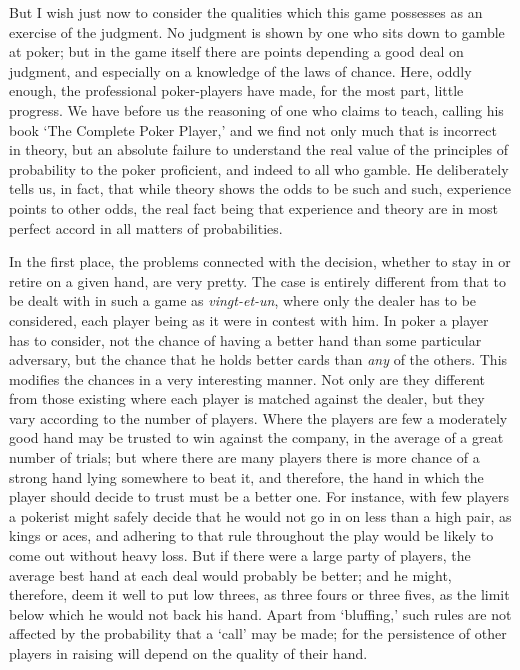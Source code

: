 \documentclass[letterpaper,12pt,oneside,openany]{memoir}
\begin{document}
But I wish just now to consider the qualities which
this game possesses as an exercise of the judgment. No
judgment is shown by one who sits down to gamble at
poker; but in the game itself there are points depending
a good deal on judgment, and especially on a knowledge
of the laws of chance. Here, oddly enough,
the professional poker-players have made, for the most
part, little progress. We have before us the reasoning
of one who claims to teach, calling his book `The Complete
Poker Player,' and we find not only much that is
incorrect in theory, but an absolute failure to understand
the real value of the principles of probability to
the poker proficient, and indeed to all who gamble. He
deliberately tells us, in fact, that while theory shows the
odds to be such and such, experience points to other
odds, the real fact being that experience and theory are
in most perfect accord in all matters of probabilities.

In the first place, the problems connected with the
decision, whether to stay in or retire on a given hand,
are very pretty. The case is entirely different from that
to be dealt with in such a game as \textit{vingt-et-un}, where
only the dealer has to be considered, each player being
as it were in contest with him. In poker a player has
to consider, not the chance of having a better hand than
some particular adversary, but the chance that he holds
better cards than \emph{any} of the others. This modifies the
chances in a very interesting manner. Not only are
they different from those existing where each player is
matched against the dealer, but they vary according to
the number of players. Where the players are few a
moderately good hand may be trusted to win against the
company, in the average of a great number of trials;
but where there are many players there is more chance
of a strong hand lying somewhere to beat it, and therefore,
the hand in which the player should decide to
trust must be a better one. For instance, with few
players a pokerist might safely decide that he would not
go in on less than a high pair, as kings or aces, and
adhering to that rule throughout the play would be
likely to come out without heavy loss. But if there
were a large party of players, the average best hand at
each deal would probably be better; and he might,
therefore, deem it well to put low threes, as three fours
or three fives, as the limit below which he would not
back his hand. Apart from `bluffing,' such rules are
not affected by the probability that a `call' may be
made; for the persistence of other players in raising will
depend on the quality of their hand.
\end{document}
